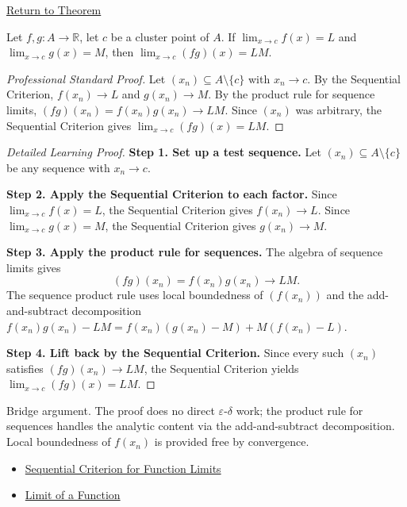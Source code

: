 \newpage
{}
\label{prf:limit-product}

\begin{remark*}[Return]
\hyperref[thm:limit-product]{Return to Theorem}
\end{remark*}

\begin{theorem*}
Let $f, g : A \to \mathbb{R}$, let $c$ be a cluster point of $A$. If
$\lim_{x\to c}f(x)=L$ and $\lim_{x\to c}g(x)=M$, then
$\lim_{x\to c}(fg)(x) = LM$.
\end{theorem*}

\begin{proof}[Professional Standard Proof]
\LRAProofBodyStart
Let $(x_n) \subseteq A \setminus \{c\}$ with $x_n \to c$.
By the Sequential Criterion, $f(x_n) \to L$ and $g(x_n) \to M$.
By the product rule for sequence limits, $(fg)(x_n) = f(x_n)g(x_n) \to LM$.
Since $(x_n)$ was arbitrary, the Sequential Criterion gives
$\lim_{x\to c}(fg)(x) = LM$.
\end{proof}

\begin{proof}[Detailed Learning Proof]
\LRAProofBodyStart
\textbf{Step 1. Set up a test sequence.}
Let $(x_n) \subseteq A \setminus \{c\}$ be any sequence with $x_n \to c$.

\textbf{Step 2. Apply the Sequential Criterion to each factor.}
Since $\lim_{x\to c}f(x)=L$, the Sequential Criterion gives $f(x_n) \to L$.
Since $\lim_{x\to c}g(x)=M$, the Sequential Criterion gives $g(x_n) \to M$.

\textbf{Step 3. Apply the product rule for sequences.}
The algebra of sequence limits gives
\[
  (fg)(x_n) = f(x_n)g(x_n) \to LM.
\]
The sequence product rule uses local boundedness of $(f(x_n))$ and the
add-and-subtract decomposition
$f(x_n)g(x_n) - LM = f(x_n)(g(x_n)-M) + M(f(x_n)-L)$.

\textbf{Step 4. Lift back by the Sequential Criterion.}
Since every such $(x_n)$ satisfies $(fg)(x_n) \to LM$, the Sequential
Criterion yields $\lim_{x\to c}(fg)(x) = LM$.
\end{proof}

\begin{remark*}
Bridge argument. The proof does no direct $\varepsilon$-$\delta$ work; the
product rule for sequences handles the analytic content via the
add-and-subtract decomposition. Local boundedness of $f(x_n)$ is provided
free by convergence.
\end{remark*}

\begin{remark*}[Dependencies]
\begin{itemize}
  \item \hyperref[prop:sequential-criterion-limits]{Sequential Criterion for Function Limits}
  \item \hyperref[def:limit-function]{Limit of a Function}
\end{itemize}
\end{remark*}

\clearpage
